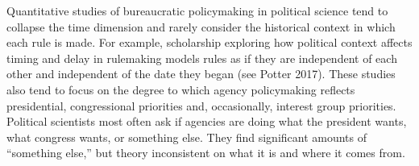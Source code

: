 Quantitative studies of bureaucratic policymaking in political science tend to collapse the time dimension and rarely consider the historical context in which each rule is made. For example, scholarship exploring how political context affects timing and delay in rulemaking models rules as if they are independent of each other and independent of the date they began (see Potter 2017). These studies also tend to focus on the degree to which agency policymaking reflects presidential, congressional priorities and, occasionally, interest group priorities. Political scientists most often ask if agencies are doing what the president wants, what congress wants, or something else. They find significant amounts of ``something else,'' but theory inconsistent on what it is and where it comes from. 






